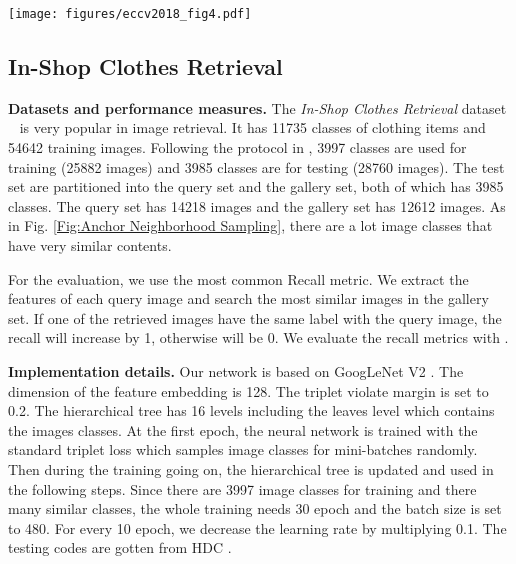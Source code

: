 \documentclass[runningheads]{llncs}
\begin{document}
\begin{figure*}[ht]
  \centering
  \texttt{[image: figures/eccv2018\_fig4.pdf]}
  \caption{Anchor-Neighbor visualization on \emph{In-Shop Clothes Retrieval} training set ~\cite{liu2016deepfashion}. Each row stands for a kind of fashion style. The row below each odd row is one of neighborhoods of the fashion style in the odd row.}
  \label{Fig:Anchor Neighborhood Sampling}
\end{figure*}


\subsection{In-Shop Clothes Retrieval}

\noindent\textbf{Datasets and performance measures.} The \emph{In-Shop Clothes Retrieval} dataset ~\cite{liu2016deepfashion} is very popular in image retrieval. It has 11735 classes of clothing items and 54642 training images. Following the protocol in \cite{liu2016deepfashion,Yuan_2017_ICCV}, 3997 classes are used for training (25882 images) and 3985 classes are for testing (28760 images). The test set are partitioned into the query set and the gallery set, both of which has 3985 classes. The query set has 14218 images and the gallery set has 12612 images. As in Fig. \ref{Fig:Anchor Neighborhood Sampling}, there are a lot image classes that have very similar contents.

For the evaluation, we use the most common Recall metric. We extract the features of each query image and search the  most similar images in the gallery set. If one of the  retrieved images have the same label with the query image, the recall will increase by 1, otherwise will be 0. We evaluate the recall metrics with .

\noindent\textbf{Implementation details.} Our network is based on GoogLeNet V2 \cite{ioffe2015batch}. The dimension  of the feature embedding is 128. The triplet violate margin is set to 0.2. The hierarchical tree has 16 levels including the leaves level which contains the images classes. At the first epoch, the neural network is trained with the standard triplet loss which samples image classes for mini-batches randomly. Then during the training going on, the hierarchical tree is updated and used in the following steps. Since there are 3997 image classes for training and there many similar classes, the whole training needs 30 epoch and the batch size is set to 480. For every 10 epoch, we decrease the learning rate by multiplying 0.1. The testing codes are gotten from HDC \cite{Yuan_2017_ICCV}.
\end{document}
